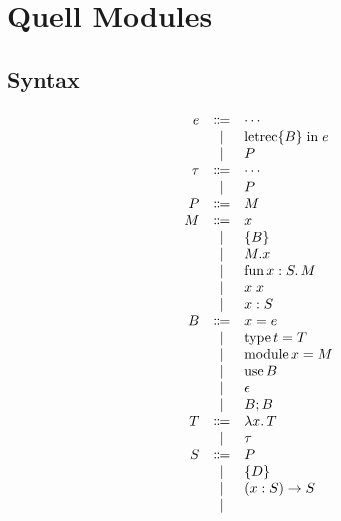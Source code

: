 \section{Quell Modules}

\subsection{Syntax}

\begin{align*}
  \begin{array}{rcl}
  e
  & \Coloneq & \cdots \\
  & \mid & \symletrec \{B\} \symin e \\
  & \mid & P \\
  \tau
  & \Coloneq & \cdots \\
  & \mid & P \\
  P
  & \Coloneq & M \\
  M
  & \Coloneq & x \\
  & \mid & \{B\} \\
  & \mid & M.x \\
  & \mid & \symfun x: S\ldotp M \\
  & \mid & x\; x \\
  & \mid & x: S \\
  B
  & \Coloneq & x = e \\
  & \mid & \symtype t = T \\
  & \mid & \symmodule x = M \\
  & \mid & \symuse B \\
  & \mid & \epsilon \\
  & \mid & B; B \\
  T
  & \Coloneq & \lambda x\ldotp T \\
  & \mid & \tau \\
  S
  & \Coloneq & P \\
  & \mid & \{D\} \\
  & \mid & (x: S) \to S \\
  & \mid &
  \end{array}
\end{align*}
